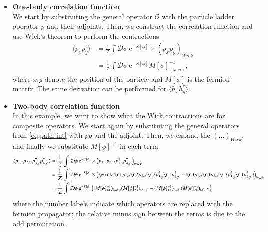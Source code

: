 \begin{itemize}
    \item \textbf{One-body correlation function}\\
    We start by substituting the general operator $\mathcal{O}$ with the particle ladder operator $p$ and their adjoints. Then, we construct the correlation function and use Wick's theorem to perform the contractions
    \begin{equation}
        \begin{aligned}
            \langle p_{x}p^\dagger_{y} \rangle &= \frac{1}{\mathcal{Z}} \int \mathcal{D}\phi \:\mathrm{e}^{-S[\phi]}\times \left(p_{x}p^\dagger_{y}\right)_{Wick} 
            \\
            &= \frac{1}{\mathcal{Z}} \int \mathcal{D}\phi \:\mathrm{e}^{-S[\phi]} M[\phi]^{-1}_{(x,y)},
        \end{aligned}
    \end{equation}
    where $x$,$y$ denote the position of the particle and $M[\phi]$ is the fermion matrix. The same derivation can be performed for $\langle h_xh^\dagger_y\rangle$.
    
    \item \textbf{Two-body correlation function}\\
    In this example, we want to show what the Wick contractions are for composite operators. We start again by substituting the general operators from \ref{eq:path-int} with $pp$ and the adjoint. Then, we expand the $\left(\dots\right)_{Wick}$, and finally we substitute $M[\phi]^{-1}$ in each term
    \begin{equation}
        \begin{aligned}
            \langle p_{1,x}p_{2,x'}p^\dagger_{3,y}p^\dagger_{4,y'} \rangle &= \frac{1}{\mathcal{Z}} \int \mathcal{D}\phi \:\mathrm{e}^{-S[\phi]}\times \left(p_{1,x}p_{2,x'}p^\dagger_{3,y}p^\dagger_{4,y'}\right)_{Wick} 
            \\
            &= \frac{1}{\mathcal{Z}} \int \mathcal{D}\phi \:\mathrm{e}^{-S[\phi]}\times \left(\wick{\c1 p_{1,x} \c2 p_{2,x'} \c2 p^\dagger_{3,y} \c1 p^\dagger_{4,y'} - \c3 p_{1,x} \c4 p_{2,x'} \c3 p^\dagger_{3,y} \c4 p^\dagger_{4,y'}}\right)_{Wick} 
            \\
            &= \frac{1}{\mathcal{Z}} \int \mathcal{D}\phi \:\mathrm{e}^{-S[\phi]} \left((M[\phi]^{-1}_{14})_{(x,y')}(M[\phi]^{-1}_{23})_{(x',y)} - (M[\phi]^{-1}_{13})_{(x,y)}(M[\phi]^{-1}_{24})_{(x',y')}\right)
        \end{aligned}
    \end{equation}
    where the number labels indicate which operators are replaced with the fermion propagator; the relative minus sign between the terms is due to the odd permutation.
\end{itemize}

